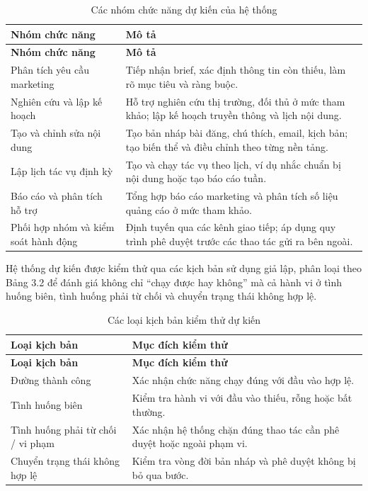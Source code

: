 \documentclass[a4paper]{article}
\begin{document}
\begin{longtable}{L{0.30\textwidth}L{0.62\textwidth}}
\caption{Các nhóm chức năng dự kiến của hệ thống}\\
\toprule
\textbf{Nhóm chức năng} & \textbf{Mô tả}\\
\midrule
\endfirsthead
\toprule
\textbf{Nhóm chức năng} & \textbf{Mô tả}\\
\midrule
\endhead
Phân tích yêu cầu marketing & Tiếp nhận brief, xác định thông tin còn thiếu, làm rõ mục tiêu và ràng buộc.\\
Nghiên cứu và lập kế hoạch & Hỗ trợ nghiên cứu thị trường, đối thủ ở mức tham khảo; lập kế hoạch truyền thông và lịch nội dung.\\
Tạo và chỉnh sửa nội dung & Tạo bản nháp bài đăng, chú thích, email, kịch bản; tạo biến thể và điều chỉnh theo từng nền tảng.\\
Lập lịch tác vụ định kỳ & Tạo và chạy tác vụ theo lịch, ví dụ nhắc chuẩn bị nội dung hoặc tạo báo cáo tuần.\\
Báo cáo và phân tích hỗ trợ & Tổng hợp báo cáo marketing và phân tích số liệu quảng cáo ở mức tham khảo.\\
Phối hợp nhóm và kiểm soát hành động & Định tuyến qua các kênh giao tiếp; áp dụng quy trình phê duyệt trước các thao tác gửi ra bên ngoài.\\
\bottomrule
\end{longtable}

Hệ thống dự kiến được kiểm thử qua các kịch bản sử dụng giả lập, phân loại theo Bảng 3.2 để đánh giá không chỉ ``chạy được hay không'' mà cả hành vi ở tình huống biên, tình huống phải từ chối và chuyển trạng thái không hợp lệ.

\begin{longtable}{L{0.34\textwidth}L{0.58\textwidth}}
\caption{Các loại kịch bản kiểm thử dự kiến}\\
\toprule
\textbf{Loại kịch bản} & \textbf{Mục đích kiểm thử}\\
\midrule
\endfirsthead
\toprule
\textbf{Loại kịch bản} & \textbf{Mục đích kiểm thử}\\
\midrule
\endhead
Đường thành công & Xác nhận chức năng chạy đúng với đầu vào hợp lệ.\\
Tình huống biên & Kiểm tra hành vi với đầu vào thiếu, rỗng hoặc bất thường.\\
Tình huống phải từ chối / vi phạm & Xác nhận hệ thống chặn đúng thao tác cần phê duyệt hoặc ngoài phạm vi.\\
Chuyển trạng thái không hợp lệ & Kiểm tra vòng đời bản nháp và phê duyệt không bị bỏ qua bước.\\
\bottomrule
\end{longtable}
\end{document}
